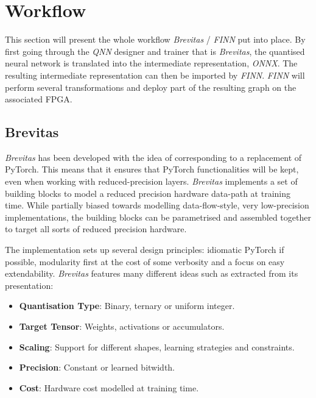\section{Workflow}

This section will present the whole workflow \emph{Brevitas} / \emph{FINN} put into place. By first going through the \emph{QNN} designer and trainer that is \emph{Brevitas}, the quantised neural network is translated into the intermediate representation, \emph{ONNX}. The resulting intermediate representation can then be imported by \emph{FINN}. \emph{FINN} will perform several transformations and deploy part of the resulting graph on the associated FPGA.


\subsection{Brevitas}

\emph{Brevitas} has been developed with the idea of corresponding to a  replacement of PyTorch. This means that it ensures that PyTorch functionalities will be kept, even when working with reduced-precision layers. \emph{Brevitas} implements a set of building blocks to model a reduced precision hardware data-path at training time. While partially biased towards modelling data-flow-style, very low-precision implementations, the building blocks can be parametrised and assembled together to target all sorts of reduced precision hardware.

The implementation sets up several design principles: idiomatic PyTorch if possible, modularity first at the cost of some verbosity and a focus on easy extendability. \emph{Brevitas} features many different ideas such as extracted from its presentation:
\begin{itemize}
  \item \textbf{Quantisation Type}: Binary, ternary or uniform integer.
  \item \textbf{Target Tensor}: Weights, activations or accumulators.
  \item \textbf{Scaling}: Support for different shapes, learning strategies and constraints.
  \item \textbf{Precision}: Constant or learned bitwidth.
  \item \textbf{Cost}: Hardware cost modelled at training time.
\end{itemize}

